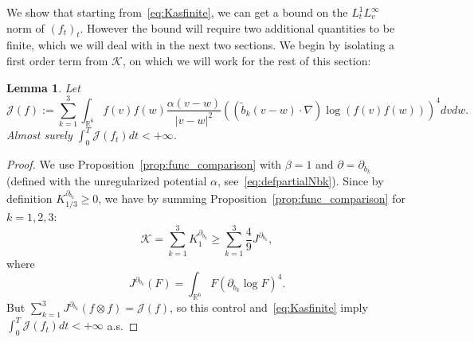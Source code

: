 \documentclass[11pt,a4paper]{article}
\theoremstyle{definition}
\theoremstyle{plain}
\newtheorem{lemma}[defi]{Lemma}
\begin{document}
We show that starting from~\eqref{eq:Kasfinite}, we can get a bound on the $L^1_t L^\infty_v$ norm of $(f_t)_t$. However the bound will require two additional quantities to be finite, which we will deal with in the next two sections.
We begin by isolating a first order term from $\mathcal{K}$, on which we will work for the rest of this section:
\begin{lemma}
\label{lem:Jasfinite}
    Let
    \begin{equation}
    \label{eq:Jasfinite}
        \mathcal{J}(f):=\sum_{k=1}^3  \int_{\mathbb{R}^{6}}f(v)f(w)  \frac{\alpha(v-w)}{\vert v - w\vert^2} \left( (\tilde{b}_k(v-w)\cdot \nabla)\log (f(v)f(w)) \right)^4 dvdw.
    \end{equation}
    Almost surely $\int_0^T\mathcal{J}(f_t)dt<+\infty$.
\end{lemma}
\begin{proof}
     We use Proposition~\ref{prop:func_comparison} with $\beta=1$ and $\partial=\partial_{b_k}$ (defined with the unregularized potential $\alpha$, see~\eqref{eq:defpartialNbk}). Since by definition $K_{1/3}^{\partial_{b_k}}\geq 0$, we have by summing Proposition~\ref{prop:func_comparison} for $k=1,2,3$:
     $$\mathcal{K}=\sum_{k=1}^3  K_1^{\partial_{b_k}}\geq \sum_{k=1}^3\frac{4}{9}J^{\partial_{b_k}},$$
     where
     $$J^{\partial_{b_k}}(F)=\int_{\mathbb{R}^{6}}F(\partial_{b_k}\log F)^4.$$
     But $\sum_{k=1}^3J^{\partial_{b_k}}(f\otimes f) = \mathcal{J}(f)$, so this control and~\eqref{eq:Kasfinite} imply
     $\int_0^T \mathcal{J}(f_t)dt<+\infty$ a.s.
\end{proof}
\end{document}
